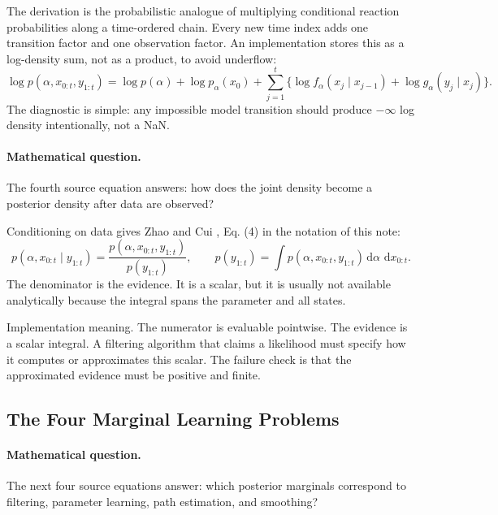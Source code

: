 \documentclass[11pt]{article}
\numberwithin{equation}{section}
\newcommand{\dd}{\,\mathrm d}
\begin{document}
The derivation is the probabilistic analogue of multiplying conditional
reaction probabilities along a time-ordered chain.  Every new time index adds
one transition factor and one observation factor.  An implementation stores
this as a log-density sum, not as a product, to avoid underflow:
\begin{equation}
    \log p(\alpha,x_{0:t},y_{1:t})
    =
    \log p(\alpha)+\log p_\alpha(x_0)
    +
    \sum_{j=1}^t
    \{\log f_\alpha(x_j\mid x_{j-1})+\log g_\alpha(y_j\mid x_j)\}.
    \label{eq:p24-bf-3a}
\end{equation}
The diagnostic is simple: any impossible model transition should produce
\(-\infty\) log density intentionally, not a NaN.

\paragraph{Mathematical question.}
The fourth source equation answers: how does the joint density become a
posterior density after data are observed?

Conditioning on data gives Zhao and Cui \cite{zhao2024ttsequential}, Eq. (4) in the notation of this note:
\begin{equation}
    p(\alpha,x_{0:t}\mid y_{1:t})
    =
    \frac{p(\alpha,x_{0:t},y_{1:t})}
    {p(y_{1:t})},
    \qquad
    p(y_{1:t})
    =
    \int p(\alpha,x_{0:t},y_{1:t})
    \dd\alpha\,\dd x_{0:t}.
    \label{eq:p24-bf-4}
\end{equation}
The denominator is the evidence.  It is a scalar, but it is usually not
available analytically because the integral spans the parameter and all states.

Implementation meaning. The numerator is evaluable pointwise.  The
evidence is a scalar integral.  A filtering algorithm that claims a likelihood
must specify how it computes or approximates this scalar.  The failure check is
that the approximated evidence must be positive and finite.

\subsection{The Four Marginal Learning Problems}

\paragraph{Mathematical question.}
The next four source equations answer: which posterior marginals correspond to
filtering, parameter learning, path estimation, and smoothing?
\end{document}
